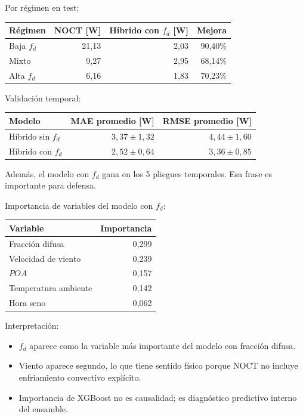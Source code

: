 \documentclass[11pt, letterpaper]{article}
\newcommand{\fd}{f_d}
\begin{document}
Por r\'egimen en test:

\begin{center}
\begin{tabular}{lrrr}
\toprule
\textbf{R\'egimen} & \textbf{NOCT [W]} & \textbf{H\'ibrido con \(\fd\) [W]} & \textbf{Mejora} \\
\midrule
Baja \(\fd\) & 21,13 & 2,03 & 90,40\% \\
Mixto & 9,27 & 2,95 & 68,14\% \\
Alta \(\fd\) & 6,16 & 1,83 & 70,23\% \\
\bottomrule
\end{tabular}
\end{center}

Validaci\'on temporal:

\begin{center}
\begin{tabular}{lrr}
\toprule
\textbf{Modelo} & \textbf{MAE promedio [W]} & \textbf{RMSE promedio [W]} \\
\midrule
H\'ibrido sin \(\fd\) & \(3,37 \pm 1,32\) & \(4,44 \pm 1,60\) \\
H\'ibrido con \(\fd\) & \(2,52 \pm 0,64\) & \(3,36 \pm 0,85\) \\
\bottomrule
\end{tabular}
\end{center}

Adem\'as, el modelo con \(\fd\) gana en los 5 pliegues temporales. Esa frase es importante para defensa.

Importancia de variables del modelo con \(\fd\):

\begin{center}
\begin{tabular}{lr}
\toprule
\textbf{Variable} & \textbf{Importancia} \\
\midrule
Fracci\'on difusa & 0,299 \\
Velocidad de viento & 0,239 \\
\(POA\) & 0,157 \\
Temperatura ambiente & 0,142 \\
Hora seno & 0,062 \\
\bottomrule
\end{tabular}
\end{center}

Interpretaci\'on:

\begin{itemize}
    \item \(\fd\) aparece como la variable m\'as importante del modelo con fracci\'on difusa.
    \item Viento aparece segundo, lo que tiene sentido f\'isico porque NOCT no incluye enfriamiento convectivo expl\'icito.
    \item Importancia de XGBoost no es causalidad; es diagn\'ostico predictivo interno del ensamble.
\end{itemize}
\end{document}
